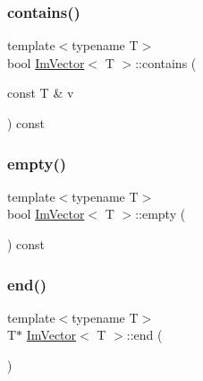 \mbox{\label{structImVector_a2e7860fbde1c721f168b6262d8f14aec}} 
\subsubsection{\texorpdfstring{contains()}{contains()}}
{\footnotesize\ttfamily template$<$typename T$>$ \\
bool \hyperlink{structImVector}{Im\+Vector}$<$ T $>$\+::contains (\begin{DoxyParamCaption}\item[{const T \&}]{v }\end{DoxyParamCaption}) const\hspace{0.3cm}{\ttfamily [inline]}}

\mbox{\label{structImVector_aa53e48a5272f4bad1099368769514ff1}} 
\subsubsection{\texorpdfstring{empty()}{empty()}}
{\footnotesize\ttfamily template$<$typename T$>$ \\
bool \hyperlink{structImVector}{Im\+Vector}$<$ T $>$\+::empty (\begin{DoxyParamCaption}{ }\end{DoxyParamCaption}) const\hspace{0.3cm}{\ttfamily [inline]}}

\mbox{\label{structImVector_aeb429e7d05b6651dfc716ecdb198dde4}} 
\subsubsection{\texorpdfstring{end()}{end()}\hspace{0.1cm}{\footnotesize\ttfamily [1/2]}}
{\footnotesize\ttfamily template$<$typename T$>$ \\
T$\ast$ \hyperlink{structImVector}{Im\+Vector}$<$ T $>$\+::end (\begin{DoxyParamCaption}{ }\end{DoxyParamCaption})\hspace{0.3cm}{\ttfamily [inline]}}

